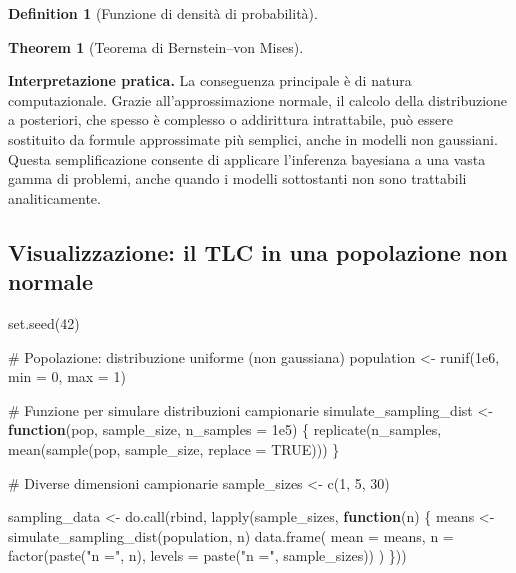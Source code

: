 \documentclass[
  letterpaper,
  DIV=11,
  numbers=noendperiod,
  oneside]{scrreprt}
\newenvironment{Shaded}{\begin{snugshade}}{\end{snugshade}}
\newcommand{\AttributeTok}[1]{\textcolor[rgb]{0.40,0.45,0.13}{#1}}
\newcommand{\CommentTok}[1]{\textcolor[rgb]{0.37,0.37,0.37}{#1}}
\newcommand{\ConstantTok}[1]{\textcolor[rgb]{0.56,0.35,0.01}{#1}}
\newcommand{\ControlFlowTok}[1]{\textcolor[rgb]{0.00,0.23,0.31}{\textbf{#1}}}
\newcommand{\DecValTok}[1]{\textcolor[rgb]{0.68,0.00,0.00}{#1}}
\newcommand{\FloatTok}[1]{\textcolor[rgb]{0.68,0.00,0.00}{#1}}
\newcommand{\FunctionTok}[1]{\textcolor[rgb]{0.28,0.35,0.67}{#1}}
\newcommand{\NormalTok}[1]{\textcolor[rgb]{0.00,0.23,0.31}{#1}}
\newcommand{\OtherTok}[1]{\textcolor[rgb]{0.00,0.23,0.31}{#1}}
\newcommand{\StringTok}[1]{\textcolor[rgb]{0.13,0.47,0.30}{#1}}
\theoremstyle{definition}
\theoremstyle{plain}
\newtheorem{theorem}{Theorem}[chapter]
\theoremstyle{definition}
\newtheorem{definition}{Definition}[chapter]
\theoremstyle{remark}
\begin{document}
\begin{definition}[Funzione di densità di
probabilità]
\begin{theorem}[Teorema di Bernstein--von
Mises]
\end{theorem}

\textbf{Interpretazione pratica.} La conseguenza principale è di natura
computazionale. Grazie all'approssimazione normale, il calcolo della
distribuzione a posteriori, che spesso è complesso o addirittura
intrattabile, può essere sostituito da formule approssimate più
semplici, anche in modelli non gaussiani. Questa semplificazione
consente di applicare l'inferenza bayesiana a una vasta gamma di
problemi, anche quando i modelli sottostanti non sono trattabili
analiticamente.

\subsection{Visualizzazione: il TLC in una popolazione non
normale}\label{visualizzazione-il-tlc-in-una-popolazione-non-normale}

\begin{Shaded}
\begin{Highlighting}[]
\FunctionTok{set.seed}\NormalTok{(}\DecValTok{42}\NormalTok{)}

\CommentTok{\# Popolazione: distribuzione uniforme (non gaussiana)}
\NormalTok{population }\OtherTok{\textless{}{-}} \FunctionTok{runif}\NormalTok{(}\FloatTok{1e6}\NormalTok{, }\AttributeTok{min =} \DecValTok{0}\NormalTok{, }\AttributeTok{max =} \DecValTok{1}\NormalTok{)}

\CommentTok{\# Funzione per simulare distribuzioni campionarie}
\NormalTok{simulate\_sampling\_dist }\OtherTok{\textless{}{-}} \ControlFlowTok{function}\NormalTok{(pop, sample\_size, }\AttributeTok{n\_samples =} \FloatTok{1e5}\NormalTok{) \{}
  \FunctionTok{replicate}\NormalTok{(n\_samples, }\FunctionTok{mean}\NormalTok{(}\FunctionTok{sample}\NormalTok{(pop, sample\_size, }\AttributeTok{replace =} \ConstantTok{TRUE}\NormalTok{)))}
\NormalTok{\}}

\CommentTok{\# Diverse dimensioni campionarie}
\NormalTok{sample\_sizes }\OtherTok{\textless{}{-}} \FunctionTok{c}\NormalTok{(}\DecValTok{1}\NormalTok{, }\DecValTok{5}\NormalTok{, }\DecValTok{30}\NormalTok{)}

\NormalTok{sampling\_data }\OtherTok{\textless{}{-}} \FunctionTok{do.call}\NormalTok{(rbind, }\FunctionTok{lapply}\NormalTok{(sample\_sizes, }\ControlFlowTok{function}\NormalTok{(n) \{}
\NormalTok{  means }\OtherTok{\textless{}{-}} \FunctionTok{simulate\_sampling\_dist}\NormalTok{(population, n)}
  \FunctionTok{data.frame}\NormalTok{(}
    \AttributeTok{mean =}\NormalTok{ means,}
    \AttributeTok{n =} \FunctionTok{factor}\NormalTok{(}\FunctionTok{paste}\NormalTok{(}\StringTok{"n ="}\NormalTok{, n), }\AttributeTok{levels =} \FunctionTok{paste}\NormalTok{(}\StringTok{"n ="}\NormalTok{, sample\_sizes))}
\NormalTok{  )}
\NormalTok{\}))}


\end{Highlighting}
\end{Shaded}
\end{definition}
\end{document}
